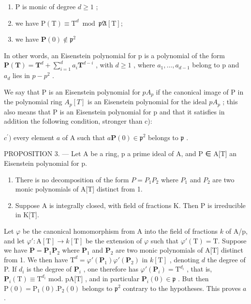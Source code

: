\begin{enumerate}
\def\labelenumi{\alph{enumi})}
\item
  P is monic of degree \(d \geqslant 1\) ;
\item
  we have \(\mathrm{P(T)}\equiv \mathrm{T}^d\bmod \mathfrak{pA}[\mathrm{T}];\)
\item
  we have \(\mathbf{P}(0)\notin \mathfrak{p}^2\)
\end{enumerate}

In other words, an Eisenstein polynomial for p is a polynomial of the form \(\mathbf{P}(\mathbf{T}) = \mathbf{T}^{d} + \sum_{i=1}^{d} a_{i} \mathbf{T}^{d-i}\) , with \(d \geqslant 1\) , where \(a_{1}, \ldots, a_{d-1}\) belong to p and \(a_{d}\) lies in \(p - p^{2}\) .

We say that P is an Eisenstein polynomial for \(pA_{p}\) if the canonical image of P in the polynomial ring \(A_{p}[T]\) is an Eisenstein polynomial for the ideal \(pA_{p}\) ; this also means that P is an Eisenstein polynomial for p and that it satisfies in addition the following condition, stronger than c):

\(c^{\prime})\) every element \(a\) of A such that \(a\mathbf{P}(0)\in\mathfrak{p}^{2}\) belongs to \(\mathfrak{p}\) .

PROPOSITION 3. --- Let A be a ring, p a prime ideal of A, and P ∈ A{[}T{]} an Eisenstein polynomial for p.

\begin{enumerate}
\def\labelenumi{\alph{enumi})}
\item
  There is no decomposition of the form \(P = P_{1}P_{2}\) where \(P_{1}\) and \(P_{2}\) are two monic polynomials of A{[}T{]} distinct from 1.
\item
  Suppose A is integrally closed, with field of fractions K. Then P is irreducible in K[T].
\end{enumerate}

Let \(\varphi\) be the canonical homomorphism from A into the field of fractions \(k\) of A/p, and let \(\varphi':\mathrm{A}[\mathrm{T}]\to k[\mathrm{T}]\) be the extension of \(\varphi\) such that \(\varphi'(\mathrm{T})=\mathrm{T}\). Suppose we have \(\mathbf{P}=\mathbf{P}_{1}\mathbf{P}_{2}\) where \(\mathbf{P}_{1}\) and \(\mathbf{P}_{2}\) are two monic polynomials of A{[}T{]} distinct from 1. We then have \(\mathrm{T}^{d}=\varphi'(\mathbf{P}_{1})\varphi'(\mathbf{P}_{2})\) in \(k[\mathrm{T}]\) , denoting \(d\) the degree of P. If \(d_{i}\) is the degree of \(\mathbf{P}_{i}\) , one therefore has \(\varphi'(\mathbf{P}_{i})=\mathrm{T}^{d_{i}}\) , that is, \(\mathbf{P}_{i}(\mathrm{T})\equiv\mathrm{T}^{d_{i}}\text{ mod. pA[T]}\) , and in particular \(\mathbf{P}_{i}(0)\in\mathfrak{p}\) . But then \(\mathrm{P}(0)=\mathrm{P}_{1}(0).\mathrm{P}_{2}(0)\) belongs to \(\mathfrak{p}^{2}\) contrary to the hypotheses. This proves \(a\).

